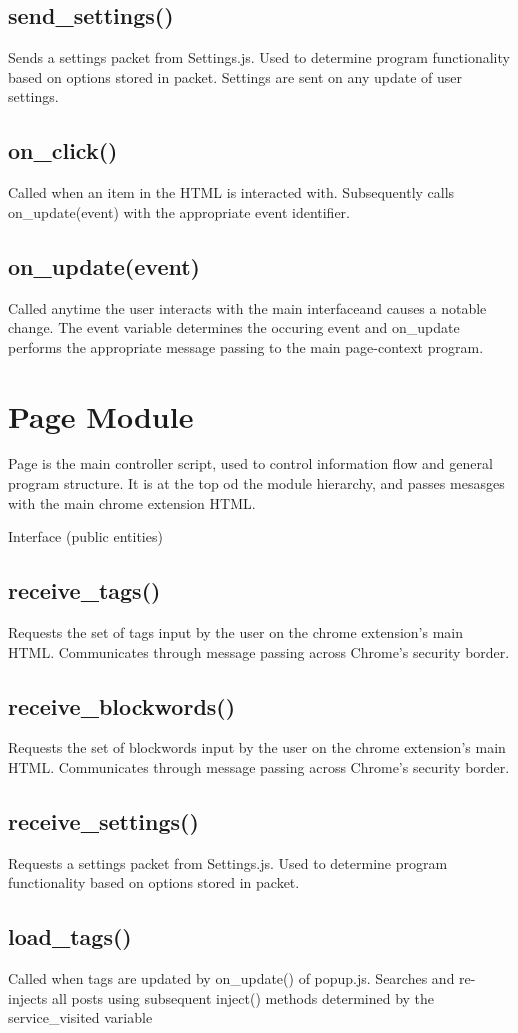\documentclass[12pt, titlepage]{article}
\begin{document}
\subsection{send\_settings()}
Sends a settings packet from Settings.js. Used to determine program functionality based on options stored in packet. Settings are sent on any update of user settings.
\subsection{on\_click()}
Called when an item in the HTML is interacted with.  Subsequently calls on\_update(event) with the appropriate event identifier.
\subsection{on\_update(event)}
Called anytime the user interacts with the main interfaceand causes a notable change. The event variable determines the occuring event and on\_update performs the appropriate message passing to the main page-context program.


\section{Page Module}
Page is the main controller script, used to control information flow and general program structure. It is at the top od %
the module hierarchy, and passes mesasges with the main chrome extension HTML.

Interface (public entities)
\subsection{receive\_tags()}
Requests the set of tags input by the user on the chrome extension’s main HTML. Communicates through message passing across Chrome’s security border.
\subsection{receive\_blockwords()}
Requests the set of blockwords input by the user on the chrome extension’s main HTML. Communicates through message passing across Chrome’s security border.
\subsection{receive\_settings()}
Requests a settings packet from Settings.js. Used to determine program functionality based on options stored in packet.
\subsection{load\_tags()}
Called when tags are updated by on\_update() of popup.js. Searches and re-injects all posts using subsequent inject() methods determined by the service\_visited variable
\end{document}
